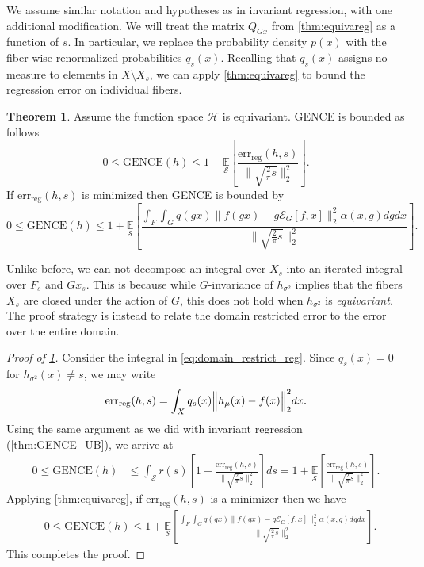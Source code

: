 \documentclass[10pt]{article} %
\theoremstyle{definition}
\newtheorem{thm}{Theorem}
\newcommand{\GENCE}{\mathrm{GENCE}(h)}
\begin{document}
We assume similar notation and hypotheses as in invariant regression, with one additional modification. We will treat the matrix $Q_{Gx}$ from \cref{thm:equivareg} as a function of $s$. In particular, we replace the probability density $p(x)$ with the fiber-wise renormalized probabilities $q_s(x)$. Recalling that $q_s(x)$ assigns no measure to elements in $X \setminus X_s$, we can apply \cref{thm:equivareg} to bound the regression error on individual fibers.

\begin{thm} \label{thm:equi_UQ_final_thm} Assume the function space $\mathscr{H}$ is equivariant. GENCE is bounded as follows $$0 \leq \GENCE \leq 1 + \underset{\mathcal{S}}{\mathbb{E}}\left[\frac{\text{err}_{\text{reg}}(h, s)}{ \lVert \sqrt{\frac{2}{\pi}s} \rVert_2^2}\right].$$ If $\text{err}_{\text{reg}}(h, s)$ is minimized then GENCE is bounded by $$0 \leq \GENCE \leq 1 + \underset{\mathcal{S}}{\mathbb{E}}\left[\frac{\int_{F} \int_G q(gx) \lVert f(gx) - g\mathcal{E}_G[f,x]\rVert_2^2 \alpha(x,g)dgdx}{\lVert \sqrt{\frac{2}{\pi}s}  \rVert_2^2} \right].$$
\end{thm}

Unlike before, we can not decompose an integral over $X_s$ into an iterated integral over $F_s$ and $Gx_s$. This is because while $G$-invariance of $h_{\sigma^2}$ implies that the fibers $X_s$ are closed under the action of $G$, this does not hold when $h_{\sigma^2}$ is \textit{equivariant.} The proof strategy is instead to relate the domain restricted error to the error over the entire domain.

\begin{proof}[Proof of \cref{thm:equi_UQ_final_thm}]
Consider the integral in  \cref{eq:domain_restrict_reg}. Since $q_s(x) = 0$ for $h_{\sigma^2}(x) \neq s$, we may write
\begin{equation*}
\text{err}_{\text{reg}}(h, s) = \int_X q_s(x)  \Bigl\lVert h_{\mu}(x) - f(x) \Bigr\rVert _2^2dx.
\end{equation*}
%
Using the same argument as we did with invariant regression (\cref{thm:GENCE_UB}), we arrive at 
%
\begin{align*}
0 \leq \GENCE &\leq \int_{\mathcal{S}} r(s) \left[1 + \frac{\text{err}_{\text{reg}}(h, s)}{ \lVert \sqrt{\frac{2}{\pi}s}   \rVert_2^2} \right]ds = 1 + \underset{\mathcal{S}}{\mathbb{E}}\left[\frac{\text{err}_{\text{reg}}(h, s)}{ \lVert \sqrt{\frac{2}{\pi}s}  \rVert_2^2}\right]. 
\end{align*}
%
Applying \cref{thm:equivareg}, if $\text{err}_{\text{reg}}(h, s)$ is a minimizer then we have
%
\begin{align}
    &0 \leq \GENCE \leq 1 +  \underset{\mathcal{S}}{\mathbb{E}}\left[\frac{\int_{F} \int_G q(gx) \lVert f(gx) - g\mathcal{E}_G[f,x]\rVert_2^2 \alpha(x,g)dgdx}{\lVert \sqrt{\frac{2}{\pi}s}   \rVert_2^2} \right] \label{eq:ence_ub}.
\end{align}
%
This completes the proof.
\end{proof}
\end{document}
